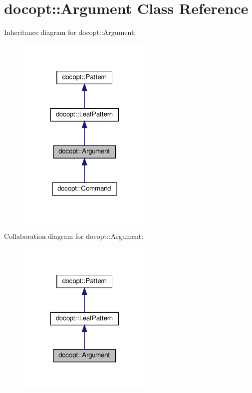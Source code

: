 \hypertarget{classdocopt_1_1Argument}{}\section{docopt\+:\+:Argument Class Reference}
\label{classdocopt_1_1Argument}


Inheritance diagram for docopt\+:\+:Argument\+:
\nopagebreak
\begin{figure}[H]
\begin{center}
\leavevmode
\includegraphics[width=182pt]{classdocopt_1_1Argument__inherit__graph}
\end{center}
\end{figure}


Collaboration diagram for docopt\+:\+:Argument\+:
\nopagebreak
\begin{figure}[H]
\begin{center}
\leavevmode
\includegraphics[width=182pt]{classdocopt_1_1Argument__coll__graph}
\end{center}
\end{figure}
